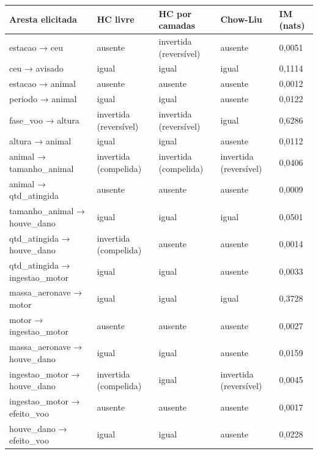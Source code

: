 \begin{tabular}{lllll}
\toprule
Aresta elicitada & HC livre & HC por camadas & Chow-Liu & IM (nats) \\
\midrule
estacao → ceu & ausente & invertida (reversível) & ausente & 0,0051 \\
ceu → avisado & igual & igual & igual & 0,1114 \\
estacao → animal & ausente & ausente & ausente & 0,0012 \\
periodo → animal & igual & igual & ausente & 0,0122 \\
fase\_voo → altura & invertida (reversível) & invertida (reversível) & igual & 0,6286 \\
altura → animal & igual & igual & ausente & 0,0112 \\
animal → tamanho\_animal & invertida (compelida) & invertida (compelida) & invertida (reversível) & 0,0406 \\
animal → qtd\_atingida & ausente & ausente & ausente & 0,0009 \\
tamanho\_animal → houve\_dano & igual & igual & igual & 0,0501 \\
qtd\_atingida → houve\_dano & invertida (compelida) & ausente & ausente & 0,0014 \\
qtd\_atingida → ingestao\_motor & igual & igual & ausente & 0,0033 \\
massa\_aeronave → motor & igual & igual & igual & 0,3728 \\
motor → ingestao\_motor & ausente & ausente & ausente & 0,0027 \\
massa\_aeronave → houve\_dano & igual & igual & ausente & 0,0159 \\
ingestao\_motor → houve\_dano & invertida (compelida) & igual & invertida (reversível) & 0,0045 \\
ingestao\_motor → efeito\_voo & ausente & ausente & ausente & 0,0017 \\
houve\_dano → efeito\_voo & igual & igual & ausente & 0,0228 \\
\bottomrule
\end{tabular}
